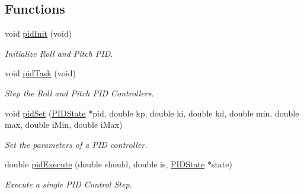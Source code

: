 \subsection*{Functions}
\begin{DoxyCompactItemize}
\item 
void \hyperlink{group__pid_ga54768e126d9accbdd7232d9fa5adfdfd}{pid\-Init} (void)
\begin{DoxyCompactList}\small\item\em Initialize Roll and Pitch P\-I\-D. \end{DoxyCompactList}\item 
void \hyperlink{group__pid_ga2683c9ee5bad3c89577ddc1bf16a219c}{pid\-Task} (void)
\begin{DoxyCompactList}\small\item\em Step the Roll and Pitch P\-I\-D Controllers. \end{DoxyCompactList}\item 
void \hyperlink{group__pid_ga1fc5e60f994041f4a534f18d1f307308}{pid\-Set} (\hyperlink{struct_p_i_d_state}{P\-I\-D\-State} $\ast$pid, double kp, double ki, double kd, double min, double max, double i\-Min, double i\-Max)
\begin{DoxyCompactList}\small\item\em Set the parameters of a P\-I\-D controller. \end{DoxyCompactList}\item 
double \hyperlink{group__pid_gaa373eb9da73ef4da4195fd5114555772}{pid\-Execute} (double should, double is, \hyperlink{struct_p_i_d_state}{P\-I\-D\-State} $\ast$state)
\begin{DoxyCompactList}\small\item\em Execute a single P\-I\-D Control Step. \end{DoxyCompactList}\end{DoxyCompactItemize}
